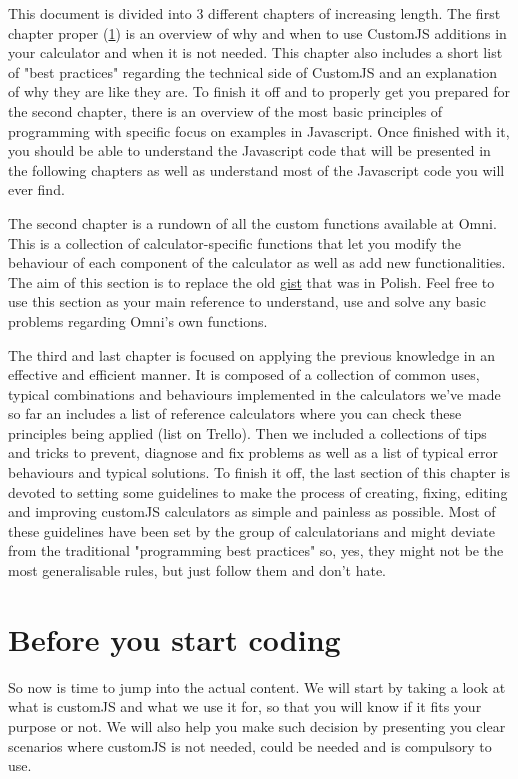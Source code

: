 \documentclass[11pt,a4paper,oldfontcommands]{memoir}
\begin{document}
This document is divided into 3 different chapters of increasing length. The first chapter proper (\ref{chap:b4}) is an overview of why and when to use CustomJS additions in your calculator and when it is not needed. This chapter also includes a short list of "best practices" regarding the technical side of CustomJS and an explanation of why they are like they are. To finish it off and to properly get you prepared for the second chapter, there is an overview of the most basic principles of programming with specific focus on examples in Javascript. Once finished with it, you should be able to understand the Javascript code that will be presented in the following chapters as well as understand most of the Javascript code you will ever find.

The second chapter is a rundown of all the custom functions available at Omni. This is a collection of calculator-specific functions that let you modify the behaviour of each component of the calculator as well as add new functionalities. The aim of this section is to replace the old \href{https://gist.github.com/trojanowski/1fd347f2b0cba5bd7ce3deb5fd3566af}{gist} that was in Polish. Feel free to use this section as your main reference to understand, use and solve any basic problems regarding Omni's own functions. 

The third and last chapter is focused on applying the previous knowledge in an effective and efficient manner. It is composed of a collection of common uses, typical combinations and behaviours implemented in the calculators we've made so far an includes a list of reference calculators where you can check these principles being applied (list on Trello). Then we included a collections of tips and tricks to prevent, diagnose and fix problems as well as a list of typical error behaviours and typical solutions. To finish it off, the last section of this chapter is devoted to setting some guidelines to make the process of creating, fixing, editing and improving customJS calculators as simple and painless as possible. Most of these guidelines have been set by the group of calculatorians and might deviate from the traditional "programming best practices" so, yes, they might not be the most generalisable rules, but just follow them and don't hate. 

\chapter{Before you start coding}
    \label{chap:b4}
So now is time to jump into the actual content. We will start by taking a look at what is customJS and what we use it for, so that you will know if it fits your purpose or not. We will also help you make such decision by presenting you clear scenarios where customJS is not needed, could be needed and is compulsory to use. 
\end{document}

